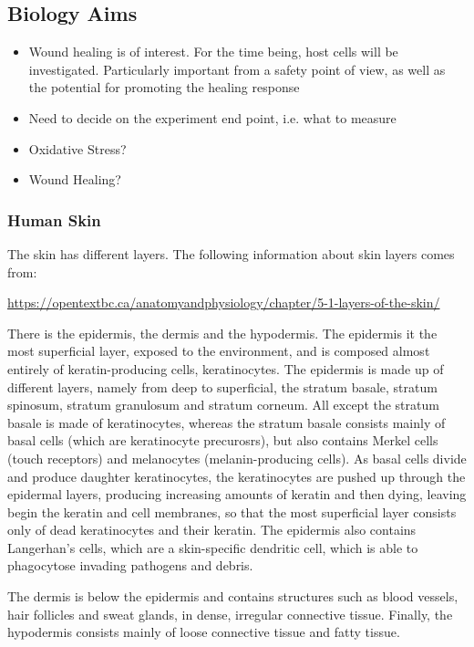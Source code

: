 \documentclass[11pt, oneside]{article}   	%
\begin{document}
\subsection{Biology Aims}

\begin{itemize}
\item Wound healing is of interest. For the time being, host cells will be investigated. Particularly important from a safety point of view, as well as the potential for promoting the healing response
\item Need to decide on the experiment end point, i.e. what to measure
\item Oxidative Stress?
\item Wound Healing?
\end{itemize}

\subsubsection{Human Skin}

The skin has different layers. The following information about skin layers comes from: 

\url{https://opentextbc.ca/anatomyandphysiology/chapter/5-1-layers-of-the-skin/}


There is the epidermis, the dermis and the hypodermis.
The epidermis it the most superficial layer, exposed to the environment, and is composed almost entirely of keratin-producing cells, keratinocytes.
The epidermis is made up of different layers, namely from deep to superficial, the stratum basale, stratum spinosum, stratum granulosum and stratum corneum.
All except the stratum basale is made of keratinocytes, whereas the stratum basale consists mainly of basal cells (which are keratinocyte precurosrs), but also contains Merkel cells (touch receptors) and melanocytes (melanin-producing cells).
As basal cells divide and produce daughter keratinocytes, the keratinocytes are pushed up through the epidermal layers, producing increasing amounts of keratin and then dying, leaving begin the keratin and cell membranes, so that the most superficial layer consists only of dead keratinocytes and their keratin.
The epidermis also contains Langerhan's cells, which are a skin-specific dendritic cell, which is able to phagocytose invading pathogens and debris.

The dermis is below the epidermis and contains structures such as blood vessels, hair follicles and sweat glands, in dense, irregular connective tissue.
Finally, the hypodermis consists mainly of loose connective tissue and fatty tissue.
\end{document}

